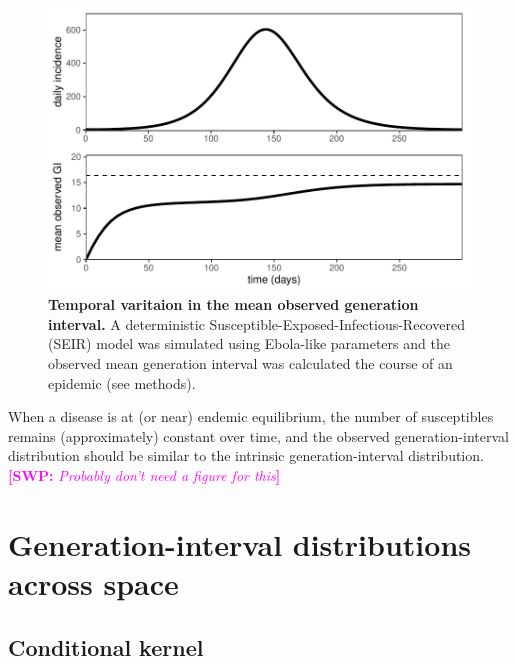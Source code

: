 \documentclass[12pt]{article}
\newcommand{\comment}[3]{\textcolor{#1}{\textbf{[#2: }\textsl{#3}\textbf{]}}}
\newcommand{\swp}[1]{\comment{magenta}{SWP}{#1}}
\begin{document}
\begin{figure}
\includegraphics[width=\textwidth]{../fig/temporal_effect.pdf}
\caption{\textbf{Temporal varitaion in the mean observed generation interval.}
A deterministic Susceptible-Exposed-Infectious-Recovered (SEIR) model was simulated using Ebola-like parameters and the observed mean generation interval was calculated the course of an epidemic (see methods).
}
\label{fig:censor}
\end{figure}

When a disease is at (or near) endemic equilibrium, the number of susceptibles remains (approximately) constant over time, and the observed generation-interval distribution should be similar to the intrinsic generation-interval distribution.
\swp{Probably don't need a figure for this}

\section{Generation-interval distributions across space}

\subsection*{Conditional kernel}
\end{document}
